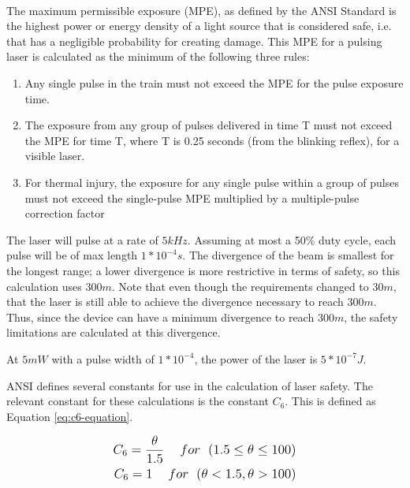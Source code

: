 \documentclass[letterpaper,10pt]{article}
\begin{document}
\begin{spacing}{1.15}
 The maximum permissible exposure (MPE), as defined by the ANSI Standard \textsuperscript{\cite{ANSI}} is the highest power or energy density of a light source that is considered safe, i.e. that has a negligible probability for creating damage. This MPE for a pulsing laser is calculated as the minimum of the following three rules:
 
 \begin{enumerate}
 	\item Any single pulse in the train must not exceed the MPE for the pulse exposure time.
 	\item The exposure from any group of pulses delivered in time T must not exceed the MPE for
 	time T, where T is 0.25 seconds (from the blinking reflex), for a visible laser. 
 	\item For thermal injury, the exposure for any single pulse within a group of pulses must not
 	exceed the single-pulse MPE multiplied by a multiple-pulse correction factor
 \end{enumerate}
 
 The laser will pulse at a rate of $5 kHz$. Assuming at most a 50\% duty cycle, each pulse will be of max length $1*10^{-4} s$. The divergence of the beam is smallest for the longest range; a lower divergence is more restrictive in terms of safety, so this calculation uses $300m$. Note that even though the requirements changed to $30m$, that the laser is still able to achieve the divergence necessary to reach $300m$. Thus, since the device can have a minimum divergence to reach $300m$, the safety limitations are calculated at this divergence. 
 
 At $5mW$ with a pulse width of $1*10^{-4}$, the power of the laser is $5*10^{-7} J$. 
 
 ANSI defines several constants for use in the calculation of laser safety. The relevant constant for these calculations is the constant $C_6$. This is defined as Equation \ref{eq:c6-equation}.
 
 \begin{align} \label{eq:c6-equation} \large \begin{split}
 C_6 =\frac{\theta}{1.5} \hspace{5mm} for \hspace{2.5mm}(1.5 \leq \theta \leq 100)
 \\
 C_6 = 1 \hspace{5mm} for \hspace{2.5mm} ( \theta < 1.5, \theta > 100)
 \end{split}
 \end{align}
 

\end{spacing}
\end{document}
